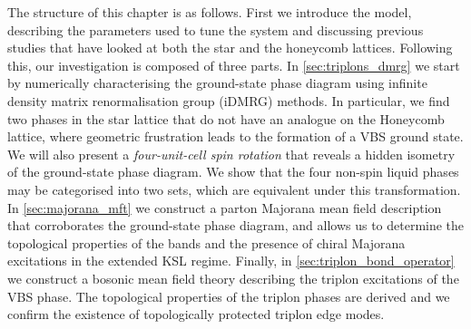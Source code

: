 The structure of this chapter is as follows. 
First we introduce the model, describing the parameters used to tune the system and discussing previous studies that have looked at both the star and the honeycomb lattices. Following this, our investigation is composed of three parts. 
In \textsection\ref{sec:triplons_dmrg} we start by numerically characterising the ground-state phase diagram using infinite density matrix renormalisation group (iDMRG) methods. In particular, we find two phases in the star lattice that do not have an analogue on the Honeycomb lattice, where geometric frustration leads to the formation of a VBS ground state. We will also present a \textit{four-unit-cell spin rotation} that reveals a hidden isometry of the ground-state phase diagram. We show that the four non-spin liquid phases may be categorised into two sets, which are equivalent under this transformation.
In \textsection\ref{sec:majorana_mft} we construct a parton Majorana mean field description that corroborates the ground-state phase diagram, and allows us to determine the topological properties of the bands and the presence of chiral Majorana excitations in the extended KSL regime. 
Finally, in \textsection\ref{sec:triplon_bond_operator} we  construct a bosonic mean field theory describing the triplon excitations of the VBS phase. The topological properties of the triplon phases are derived and we confirm the existence of topologically protected triplon edge modes. 

